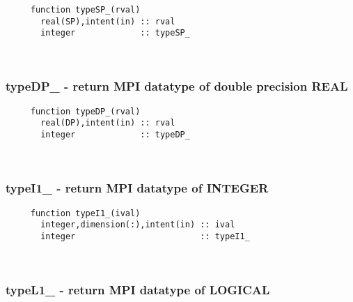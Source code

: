 \begin{verbatim} 
     function typeSP_(rval)
       real(SP),intent(in) :: rval
       integer             :: typeSP_
 \end{verbatim}%
 
 
\mbox{}\hrulefill\ 

  \subsubsection{typeDP\_ - return MPI datatype of double precision REAL}

\begin{verbatim} 
     function typeDP_(rval)
       real(DP),intent(in) :: rval
       integer             :: typeDP_
 \end{verbatim}%
 
 
\mbox{}\hrulefill\ 

  \subsubsection{typeI1\_ - return MPI datatype of INTEGER}

\begin{verbatim} 
     function typeI1_(ival)
       integer,dimension(:),intent(in) :: ival
       integer                         :: typeI1_
 \end{verbatim}%
 
 
\mbox{}\hrulefill\ 
 
  \subsubsection{typeL1\_ - return MPI datatype of LOGICAL}

